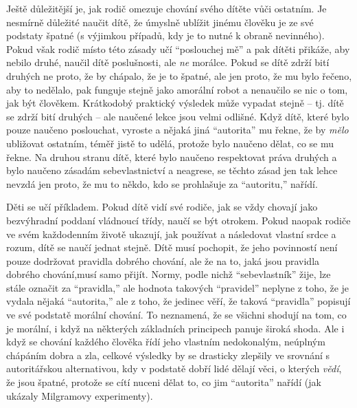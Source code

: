 \documentclass{book}
\begin{document}
Ještě důležitější je, jak rodič omezuje chování svého dítěte vůči ostatním. Je nesmírně důležité naučit dítě, že úmyslně ublížit jinému člověku je ze své podstaty špatné (s výjimkou případů, kdy je to nutné k obraně nevinného). Pokud však rodič místo této zásady učí \enquote{poslouchej mě} a pak dítěti přikáže, aby nebilo druhé, naučil dítě poslušnosti, ale \emph{ne} morálce. Pokud se dítě zdrží bití druhých ne proto, že by chápalo, že je to špatné, ale jen proto, že mu bylo řečeno, aby to nedělalo, pak funguje stejně jako amorální robot a nenaučilo se nic o tom, jak být člověkem. Krátkodobý praktický výsledek může vypadat stejně -- tj. dítě se zdrží bití druhých -- ale naučené lekce jsou velmi odlišné. Když dítě, které bylo pouze naučeno poslouchat, vyroste a nějaká jiná \enquote{autorita} mu řekne, že by \emph{mělo} ubližovat ostatním, téměř jistě to udělá, protože bylo naučeno dělat, co se mu řekne. Na druhou stranu dítě, které bylo naučeno respektovat práva druhých a bylo naučeno zásadám sebevlastnictví a neagrese, se těchto zásad jen tak lehce nevzdá jen proto, že mu to někdo, kdo se prohlašuje za \enquote{autoritu,} nařídí.

Děti se učí příkladem. Pokud dítě vidí své rodiče, jak se vždy chovají jako bezvýhradní poddaní vládnoucí třídy, naučí se být otrokem. Pokud naopak rodiče ve svém každodenním životě ukazují, jak používat a následovat vlastní srdce a rozum, dítě se naučí jednat stejně. Dítě musí pochopit, že jeho povinností není pouze dodržovat pravidla dobrého chování, ale že na to, jaká jsou pravidla dobrého chování,musí samo přijít. Normy, podle nichž \enquote{sebevlastník} žije, lze stále označit za \enquote{pravidla,} ale hodnota takových \enquote{pravidel} neplyne z toho, že je vydala nějaká \enquote{autorita,} ale z toho, že jedinec věří, že taková \enquote{pravidla} popisují ve své podstatě morální chování. To neznamená, že se všichni shodují na tom, co je morální, i když na některých základních principech panuje široká shoda. Ale i když se chování každého člověka řídí jeho vlastním nedokonalým, neúplným chápáním dobra a zla, celkové výsledky by se drasticky zlepšily ve srovnání s autoritářskou alternativou, kdy v podstatě dobří lidé dělají věci, o kterých \emph{vědí}, že jsou špatné, protože se cítí nuceni dělat to, co jim \enquote{autorita} nařídí (jak ukázaly Milgramovy experimenty).
\end{document}
